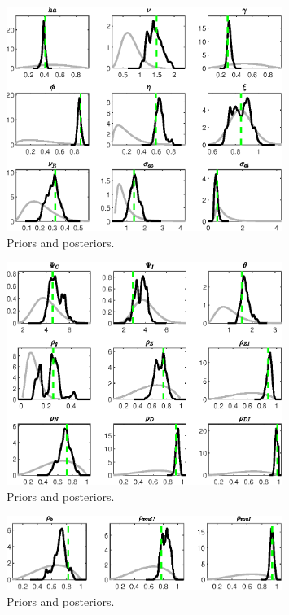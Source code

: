 \begin{figure}[H]
\centering
\includegraphics[width=0.80\textwidth]{BRS_sectoral_artificial_data/Output/BRS_sectoral_artificial_data_PriorsAndPosteriors3}
\caption{Priors and posteriors.}\label{Fig:PriorsAndPosteriors:3}
\end{figure}
 
\begin{figure}[H]
\centering
\includegraphics[width=0.80\textwidth]{BRS_sectoral_artificial_data/Output/BRS_sectoral_artificial_data_PriorsAndPosteriors4}
\caption{Priors and posteriors.}\label{Fig:PriorsAndPosteriors:4}
\end{figure}
 
\begin{figure}[H]
\centering
\includegraphics[width=0.80\textwidth]{BRS_sectoral_artificial_data/Output/BRS_sectoral_artificial_data_PriorsAndPosteriors5}
\caption{Priors and posteriors.}\label{Fig:PriorsAndPosteriors:5}
\end{figure}
 
